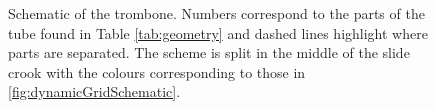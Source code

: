 \begin{figure}[h]
\begin{tikzpicture}[scale = 8]
    
    \end{tikzpicture}
    \caption{Schematic of the trombone. Numbers correspond to the parts of the tube found in Table \ref{tab:geometry} and dashed lines highlight where parts are separated. The scheme is split in the middle of the slide crook with the colours corresponding to those in \ref{fig:dynamicGridSchematic}.}
    \label{fig:tromboneSchematic}
\end{figure}